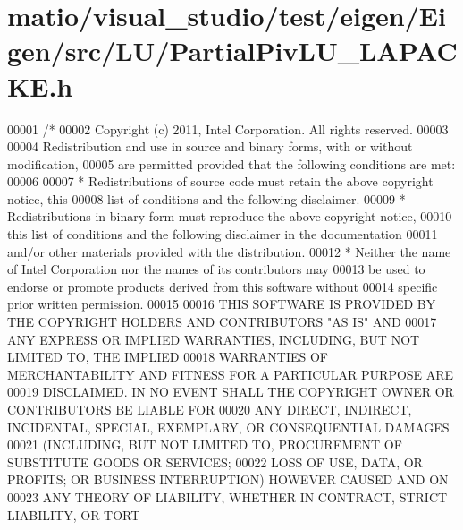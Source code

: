 \hypertarget{matio_2visual__studio_2test_2eigen_2_eigen_2src_2_l_u_2_partial_piv_l_u___l_a_p_a_c_k_e_8h_source}{}\section{matio/visual\+\_\+studio/test/eigen/\+Eigen/src/\+L\+U/\+Partial\+Piv\+L\+U\+\_\+\+L\+A\+P\+A\+C\+KE.h}
\label{matio_2visual__studio_2test_2eigen_2_eigen_2src_2_l_u_2_partial_piv_l_u___l_a_p_a_c_k_e_8h_source}

\begin{DoxyCode}
00001 \textcolor{comment}{/*}
00002 \textcolor{comment}{ Copyright (c) 2011, Intel Corporation. All rights reserved.}
00003 \textcolor{comment}{}
00004 \textcolor{comment}{ Redistribution and use in source and binary forms, with or without modification,}
00005 \textcolor{comment}{ are permitted provided that the following conditions are met:}
00006 \textcolor{comment}{}
00007 \textcolor{comment}{ * Redistributions of source code must retain the above copyright notice, this}
00008 \textcolor{comment}{   list of conditions and the following disclaimer.}
00009 \textcolor{comment}{ * Redistributions in binary form must reproduce the above copyright notice,}
00010 \textcolor{comment}{   this list of conditions and the following disclaimer in the documentation}
00011 \textcolor{comment}{   and/or other materials provided with the distribution.}
00012 \textcolor{comment}{ * Neither the name of Intel Corporation nor the names of its contributors may}
00013 \textcolor{comment}{   be used to endorse or promote products derived from this software without}
00014 \textcolor{comment}{   specific prior written permission.}
00015 \textcolor{comment}{}
00016 \textcolor{comment}{ THIS SOFTWARE IS PROVIDED BY THE COPYRIGHT HOLDERS AND CONTRIBUTORS "AS IS" AND}
00017 \textcolor{comment}{ ANY EXPRESS OR IMPLIED WARRANTIES, INCLUDING, BUT NOT LIMITED TO, THE IMPLIED}
00018 \textcolor{comment}{ WARRANTIES OF MERCHANTABILITY AND FITNESS FOR A PARTICULAR PURPOSE ARE}
00019 \textcolor{comment}{ DISCLAIMED. IN NO EVENT SHALL THE COPYRIGHT OWNER OR CONTRIBUTORS BE LIABLE FOR}
00020 \textcolor{comment}{ ANY DIRECT, INDIRECT, INCIDENTAL, SPECIAL, EXEMPLARY, OR CONSEQUENTIAL DAMAGES}
00021 \textcolor{comment}{ (INCLUDING, BUT NOT LIMITED TO, PROCUREMENT OF SUBSTITUTE GOODS OR SERVICES;}
00022 \textcolor{comment}{ LOSS OF USE, DATA, OR PROFITS; OR BUSINESS INTERRUPTION) HOWEVER CAUSED AND ON}
00023 \textcolor{comment}{ ANY THEORY OF LIABILITY, WHETHER IN CONTRACT, STRICT LIABILITY, OR TORT}

\end{DoxyCode}
